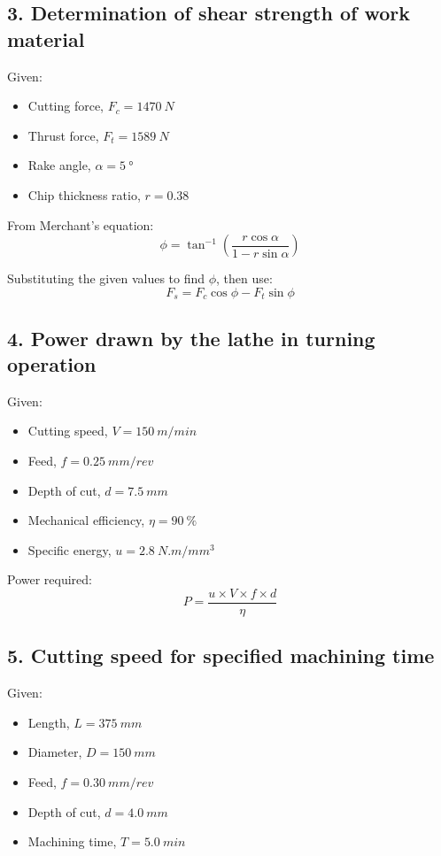 \documentclass{article}
\begin{document}
\subsection*{3. Determination of shear strength of work material}
Given: 
\begin{itemize}
    \item Cutting force, $F_c = \SI{1470}{N}$
    \item Thrust force, $F_t = \SI{1589}{N}$
    \item Rake angle, $\alpha = \SI{5}{\degree}$
    \item Chip thickness ratio, $r = 0.38$
\end{itemize}

From Merchant's equation:
\begin{equation}
    \phi = \tan^{-1}\left(\frac{r \cos \alpha}{1 - r \sin \alpha}\right)
\end{equation}

Substituting the given values to find $\phi$, then use:
\begin{equation}
    F_s = F_c \cos \phi - F_t \sin \phi
\end{equation}

\subsection*{4. Power drawn by the lathe in turning operation}
Given:
\begin{itemize}
    \item Cutting speed, $V = \SI{150}{m/min}$
    \item Feed, $f = \SI{0.25}{mm/rev}$
    \item Depth of cut, $d = \SI{7.5}{mm}$
    \item Mechanical efficiency, $\eta = \SI{90}{\percent}$
    \item Specific energy, $u = \SI{2.8}{N.m/mm^3}$
\end{itemize}

Power required:
\begin{equation}
    P = \frac{u \times V \times f \times d}{\eta}
\end{equation}

\subsection*{5. Cutting speed for specified machining time}
Given:
\begin{itemize}
    \item Length, $L = \SI{375}{mm}$
    \item Diameter, $D = \SI{150}{mm}$
    \item Feed, $f = \SI{0.30}{mm/rev}$
    \item Depth of cut, $d = \SI{4.0}{mm}$
    \item Machining time, $T = \SI{5.0}{min}$
\end{itemize}
\end{document}
